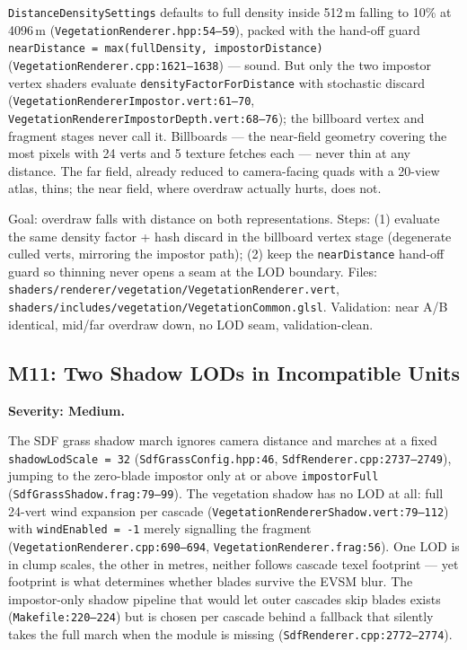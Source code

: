 \documentclass[11pt,a4paper]{article}
\begin{document}
\texttt{DistanceDensitySettings} defaults to full density inside 512\,m
falling to 10\% at 4096\,m
(\texttt{VegetationRenderer.hpp:54--59}), packed with the hand-off guard
\texttt{nearDistance = max(fullDensity, impostorDistance)}
(\texttt{VegetationRenderer.cpp:1621--1638}) --- sound. But only the two
impostor vertex shaders evaluate \texttt{densityFactorForDistance} with
stochastic discard (\texttt{VegetationRendererImpostor.vert:61--70},
\texttt{VegetationRendererImpostorDepth.vert:68--76}); the billboard vertex
and fragment stages never call it. Billboards --- the near-field geometry
covering the most pixels with 24 verts and 5 texture fetches each --- never
thin at any distance. The far field, already reduced to camera-facing quads
with a 20-view atlas, thins; the near field, where overdraw actually hurts,
does not.

\begin{tcolorbox}[promptbox={Prompt --- M10: thin billboards, not just impostors}]
Goal: overdraw falls with distance on both representations. Steps:
(1) evaluate the same density factor + hash discard in the billboard vertex
stage (degenerate culled verts, mirroring the impostor path); (2) keep the
\texttt{nearDistance} hand-off guard so thinning never opens a seam at the
LOD boundary. Files:
\texttt{shaders/renderer/vegetation/VegetationRenderer.vert},
\texttt{shaders/includes/vegetation/VegetationCommon.glsl}. Validation:
near A/B identical, mid/far overdraw down, no LOD seam, validation-clean.
\end{tcolorbox}

\subsection{M11: Two Shadow LODs in Incompatible Units}

\textbf{Severity: Medium.}

The SDF grass shadow march ignores camera distance and marches at a fixed
\texttt{shadowLodScale = 32} (\texttt{SdfGrassConfig.hpp:46},
\texttt{SdfRenderer.cpp:2737--2749}), jumping to the zero-blade impostor
only at or above \texttt{impostorFull} (\texttt{SdfGrassShadow.frag:79--99}).
The vegetation shadow has no LOD at all: full 24-vert wind expansion per
cascade (\texttt{VegetationRendererShadow.vert:79--112}) with
\texttt{windEnabled = -1} merely signalling the fragment
(\texttt{VegetationRenderer.cpp:690--694},
\texttt{VegetationRenderer.frag:56}). One LOD is in clump scales, the other
in metres, neither follows cascade texel footprint --- yet footprint is what
determines whether blades survive the EVSM blur. The impostor-only shadow
pipeline that would let outer cascades skip blades exists
(\texttt{Makefile:220--224}) but is chosen per cascade behind a fallback
that silently takes the full march when the module is missing
(\texttt{SdfRenderer.cpp:2772--2774}).
\end{document}
